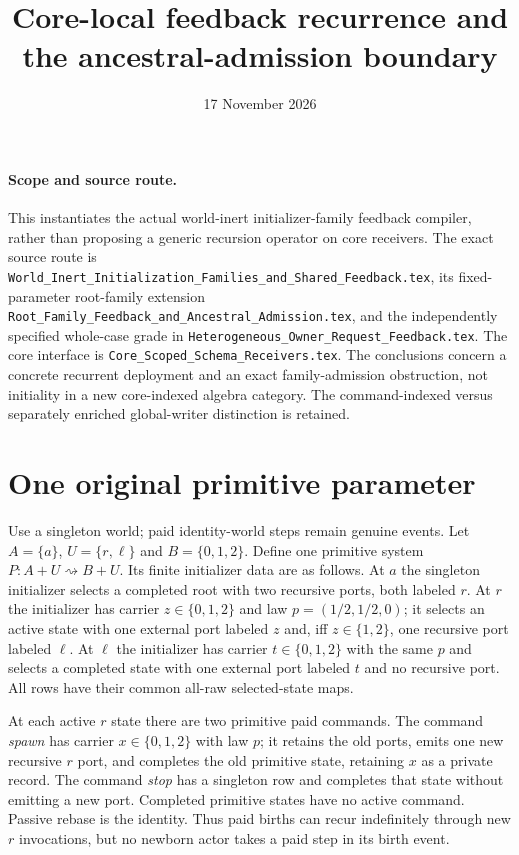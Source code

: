 \documentclass[11pt]{article}
\title{Core-local feedback recurrence and the ancestral-admission boundary}
\date{17 November 2026}
\begin{document}
\maketitle
\paragraph{Scope and source route.}
This instantiates the actual world-inert initializer-family feedback compiler, rather than proposing a generic recursion operator on core receivers. The exact source route is \texttt{World\_Inert\_Initialization\_Families\_and\_Shared\_Feedback.tex}, its fixed-parameter root-family extension \texttt{Root\_Family\_Feedback\_and\_Ancestral\_Admission.tex}, and the independently specified whole-case grade in \texttt{Heterogeneous\_Owner\_Request\_Feedback.tex}. The core interface is \texttt{Core\_Scoped\_Schema\_Receivers.tex}. The conclusions concern a concrete recurrent deployment and an exact family-admission obstruction, not initiality in a new core-indexed algebra category. The command-indexed versus separately enriched global-writer distinction is retained.

\section{One original primitive parameter}
Use a singleton world; paid identity-world steps remain genuine events. Let $A=\{a\}$, $U=\{r,\ell\}$ and $B=\{0,1,2\}$. Define one primitive system $P:A+U\rightsquigarrow B+U$. Its finite initializer data are as follows. At $a$ the singleton initializer selects a completed root with two recursive ports, both labeled $r$. At $r$ the initializer has carrier $z\in\{0,1,2\}$ and law $p=(1/2,1/2,0)$; it selects an active state with one external port labeled $z$ and, iff $z\in\{1,2\}$, one recursive port labeled $\ell$. At $\ell$ the initializer has carrier $t\in\{0,1,2\}$ with the same $p$ and selects a completed state with one external port labeled $t$ and no recursive port. All rows have their common all-raw selected-state maps.

At each active $r$ state there are two primitive paid commands. The command \emph{spawn} has carrier $x\in\{0,1,2\}$ with law $p$; it retains the old ports, emits one new recursive $r$ port, and completes the old primitive state, retaining $x$ as a private record. The command \emph{stop} has a singleton row and completes that state without emitting a new port. Completed primitive states have no active command. Passive rebase is the identity. Thus paid births can recur indefinitely through new $r$ invocations, but no newborn actor takes a paid step in its birth event.
\end{document}
